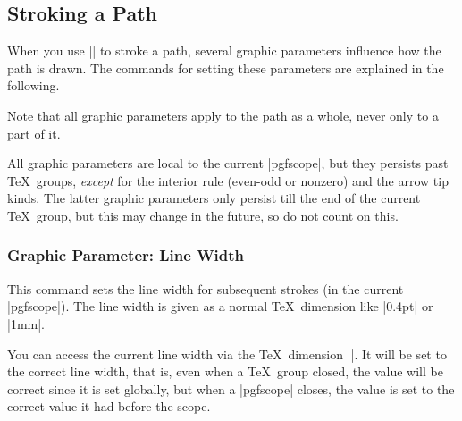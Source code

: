 \subsection{Stroking a Path}
\label{section-stroke}

When you use || to stroke a path, several graphic
parameters influence how the path is drawn. The commands for setting
these parameters are explained in the following.

Note that all graphic parameters apply to the path as a whole, never
only to a part of it.

All graphic parameters are local to the current |{pgfscope}|, but they
persists past \TeX\ groups, \emph{except} for the interior rule
(even-odd or nonzero) and the arrow tip kinds. The latter graphic
parameters only persist till the end of the current \TeX\ group, but 
this may change in the future, so do not count on this.

\subsubsection{Graphic Parameter: Line Width}

\begin{command}{\pgfsetlinewidth{}}
  This command sets the line width for subsequent strokes (in the
  current |pgfscope|). The line width is given as a normal \TeX\
  dimension like |0.4pt| or |1mm|.

\begin{codeexample}[]
\begin{pgfpicture}
  \pgfsetlinewidth{1mm}
  \pgfpathmoveto{\pgfpoint{0mm}{0mm}}
  \pgfpathlineto{\pgfpoint{2cm}{0mm}}
  \pgfsetlinewidth{2\pgflinewidth} %
  \pgfpathmoveto{\pgfpoint{0mm}{5mm}}
  \pgfpathlineto{\pgfpoint{2cm}{5mm}}
\end{pgfpicture}
\end{codeexample}
\end{command}

\begin{textoken}{\pgflinewidth}
  You can access the current line width via the \TeX\ dimension
  |\pgflinewidth|. It will be set to the correct line width, that is,
  even when a \TeX\ group closed, the value will be correct since it
  is set globally, but when a |{pgfscope}| closes, the value is set to
  the correct value it had before the scope.
\end{textoken}


